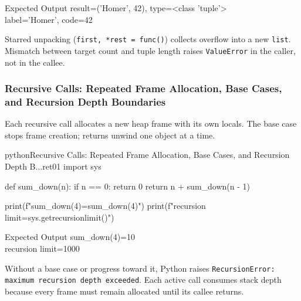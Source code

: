\begin{iobox}{Expected Output}
result=('Homer', 42), type=<class 'tuple'> \\
label='Homer', code=42 \\
\end{iobox}




Starred unpacking (\texttt{first, *rest = func()}) collects overflow into a new \texttt{list}. Mismatch between target count and tuple length raises \texttt{ValueError} in the caller, not in the callee.

\subsubsection{Recursive Calls: Repeated Frame Allocation, Base Cases, and Recursion Depth Boundaries}

Each recursive call allocates a new heap frame with its own locals. The base case stops frame creation; returns unwind one object at a time.

\begin{codebox}[]{python}{Recursive Calls: Repeated Frame Allocation, Base Cases, and Recursion Depth B...}{ret01}
import sys

def sum_down(n):
    if n == 0:
        return 0
    return n + sum_down(n - 1)

print(f"sum_down(4)={sum_down(4)}")
print(f"recursion limit={sys.getrecursionlimit()}")
\end{codebox}


\begin{iobox}{Expected Output}
sum\_down(4)=10 \\
recursion limit=1000 \\
\end{iobox}




Without a base case or progress toward it, Python raises \texttt{RecursionError: maximum recursion depth exceeded}. Each active call consumes stack depth because every frame must remain allocated until its callee returns.
